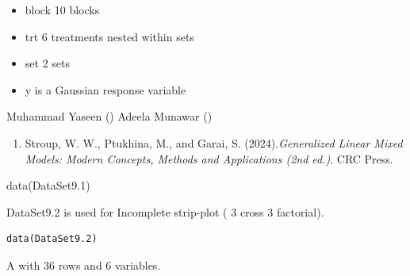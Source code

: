 \documentclass[a4paper]{book}
\begin{document}
%
\begin{Details}
\begin{itemize}

\item{} block  10 blocks
\item{} trt    6 treatments nested within sets
\item{} set    2 sets
\item{} y      is a Gaussian response variable

\end{itemize}

\end{Details}
%
\begin{Author}
Muhammad Yaseen ()
Adeela Munawar ()
\end{Author}
%
\begin{References}
\begin{enumerate}

\item{} Stroup, W. W., Ptukhina, M., and Garai, S. (2024).\emph{Generalized Linear Mixed Models: Modern Concepts, Methods and Applications (2nd ed.)}.
CRC Press.

\end{enumerate}

\end{References}
%
\begin{SeeAlso}
\end{SeeAlso}
%
\begin{Examples}
\begin{ExampleCode}
data(DataSet9.1)
\end{ExampleCode}
\end{Examples}
%
\begin{Description}
DataSet9.2 is used for Incomplete strip-plot ( 3 cross 3 factorial).
\end{Description}
%
\begin{Usage}
\begin{verbatim}
data(DataSet9.2)
\end{verbatim}
\end{Usage}
%
\begin{Format}
A  with 36 rows and 6 variables.
\end{Format}
%
\end{document}
